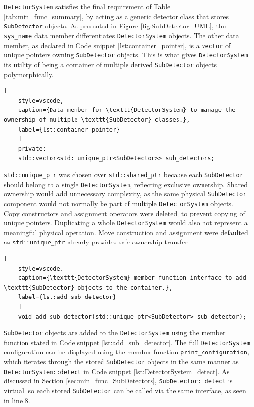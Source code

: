 \documentclass{article}
\begin{document}
\texttt{DetectorSystem} satisfies the final requirement of Table \ref{tab:min_func_summary}, by acting as a generic detector class that stores \texttt{SubDetector} objects.
As presented in Figure \ref{fig:SubDetector_UML}, the \texttt{sys\_name} data member differentiates \texttt{DetectorSystem} objects.
The other data member, as declared in Code snippet \ref{lst:container_pointer}, is a \texttt{vector} of unique pointers owning \texttt{SubDetector} objects.
This is what gives \texttt{DetectorSystem} its utility of being a container of multiple derived \texttt{SubDetector} objects polymorphically.
\begin{lstlisting}[
    style=vscode, 
    caption={Data member for \texttt{DetectorSystem} to manage the ownership of multiple \texttt{SubDetector} classes.},
    label={lst:container_pointer}
    ]
    private:
    std::vector<std::unique_ptr<SubDetector>> sub_detectors;
\end{lstlisting}
\texttt{std::unique\_ptr} was chosen over \texttt{std::shared\_ptr} because each \texttt{SubDetector} should belong to a single \texttt{DetectorSystem}, reflecting exclusive ownership.
Shared ownership would add unnecessary complexity, as the same physical \texttt{SubDetector} component would not normally be part of multiple \texttt{DetectorSystem} objects.
Copy constructors and assignment operators were deleted, to prevent copying of unique pointers. Duplicating a whole \texttt{DetectorSystem} would also not represent a meaningful physical operation.
Move construction and assignment were defaulted as \texttt{std::unique\_ptr} already provides safe ownership transfer.
\begin{lstlisting}[
    style=vscode, 
    caption={\texttt{DetectorSystem} member function interface to add \texttt{SubDetector} objects to the container.},
    label={lst:add_sub_detector}
    ]
    void add_sub_detector(std::unique_ptr<SubDetector> sub_detector);
\end{lstlisting}
\texttt{SubDetector} objects are added to the \texttt{DetectorSystem} using the member function stated in Code snippet \ref{lst:add_sub_detector}.
The full \texttt{DetectorSystem} configuration can be displayed using the member function \texttt{print\_configuration}, which iterates through the stored \texttt{SubDetector} objects in the same manner as \texttt{DetectorSystem::detect} in Code snippet \ref{lst:DetectorSystem_detect}.
As discussed in Section \ref{sec:min_func_SubDetectors}, \texttt{SubDetector::detect} is virtual, so each stored \texttt{SubDetector} can be called via the same interface, as seen in line 8.
\end{document}
